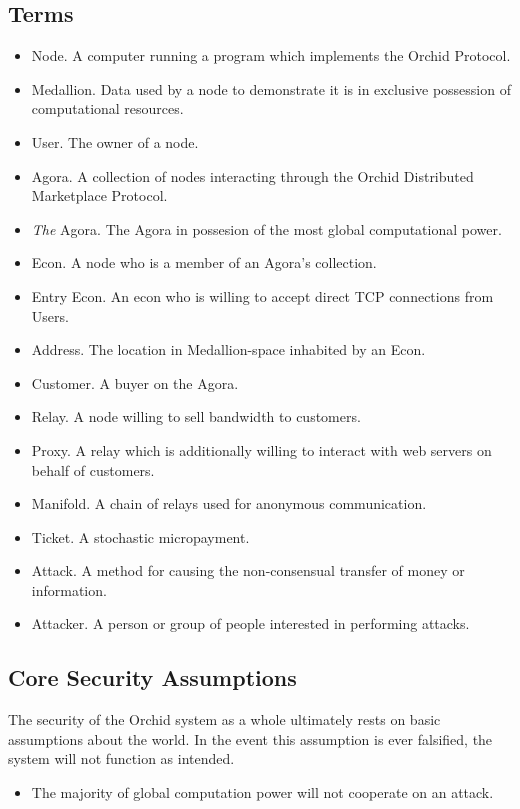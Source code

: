 \documentclass{article}
\newcommand{\mesh}{Orchid}
\begin{document}
\subsection{Terms}

\begin{itemize}
\item Node. A computer running a program which implements the \mesh{} Protocol.
\item Medallion. Data used by a node to demonstrate it is in exclusive possession of computational resources.
\item User. The owner of a node.
\item Agora. A collection of nodes interacting through the \mesh{} Distributed Marketplace Protocol.
\item \emph{The} Agora. The Agora in possesion of the most global computational power.
\item Econ. A node who is a member of an Agora's collection.
\item Entry Econ. An econ who is willing to accept direct TCP connections from Users.
\item Address. The location in Medallion-space inhabited by an Econ.
\item Customer. A buyer on the Agora.
\item Relay. A node willing to sell bandwidth to customers.
\item Proxy. A relay which is additionally willing to interact with web servers on behalf of customers.
\item Manifold. A chain of relays used for anonymous communication.
\item Ticket. A stochastic micropayment.
\item Attack. A method for causing the non-consensual transfer of money or information.
\item Attacker. A person or group of people interested in performing attacks.
\end{itemize}

\subsection{Core Security Assumptions}
\label{core-security}

The security of the \mesh{} system as a whole ultimately rests on basic assumptions about the world. In the event this assumption is ever falsified, the system will not function as intended.

\begin{itemize}
\item The majority of global computation power will not cooperate on an attack.
\end{itemize}
\end{document}
